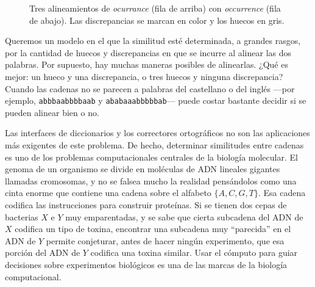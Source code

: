 \documentclass[12pt, spanish, oneside, openany]{book}
\theoremstyle{uprightplain}
\theoremstyle{definition}
\theoremstyle{remark}
\theoremstyle{definition}
\begin{document}
\begin{figure}[H]
\centering
{}
\caption{Tres alineamientos de \emph{ocurrance} (fila de arriba) con
\emph{occurrence} (fila de abajo). Las discrepancias se marcan en color y los
huecos en gris.}
\label{fig:dp-ocurrance}
\end{figure}

Queremos un modelo en el que la similitud esté determinada, a grandes rasgos, por la cantidad de huecos y discrepancias en que se incurre al alinear las dos palabras. Por supuesto, hay muchas maneras posibles de alinearlas. ¿Qué es mejor: un hueco y una discrepancia, o tres huecos y ninguna discrepancia? Cuando las cadenas no se parecen a palabras del castellano o del inglés ---por ejemplo, \texttt{abbbaabbbbaab} y \texttt{ababaaabbbbbab}--- puede costar bastante decidir si se pueden alinear bien o no.

Las interfaces de diccionarios y los correctores ortográficos no son las aplicaciones más exigentes de este problema. De hecho, determinar similitudes entre cadenas es uno de los problemas computacionales centrales de la biología molecular. El genoma de un organismo se divide en moléculas de ADN lineales gigantes llamadas cromosomas, y no se falsea mucho la realidad pensándolos como una cinta enorme que contiene una cadena sobre el alfabeto $\{A,C,G,T\}$. Esa cadena codifica las instrucciones para construir proteínas. Si se tienen dos cepas de bacterias $X$ e $Y$ muy emparentadas, y se sabe que cierta subcadena del ADN de $X$ codifica un tipo de toxina, encontrar una subcadena muy ``parecida'' en el ADN de $Y$ permite conjeturar, antes de hacer ningún experimento, que esa porción del ADN de $Y$ codifica una toxina similar. Usar el cómputo para guiar decisiones sobre experimentos biológicos es una de las marcas de la biología computacional.
\end{document}
